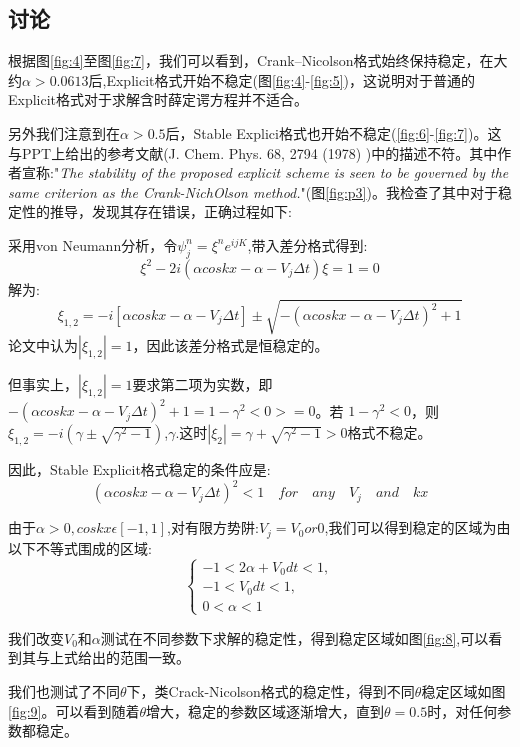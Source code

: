 \documentclass[11pt]{article}
\begin{document}
\subsection{讨论}
根据图\ref{fig:4}至图\ref{fig:7}，我们可以看到，Crank–Nicolson格式始终保持稳定，在大约$\alpha>0.0613$后,Explicit格式开始不稳定(图\ref{fig:4}-\ref{fig:5})，这说明对于普通的Explicit格式对于求解含时薛定谔方程并不适合。

另外我们注意到在$\alpha>0.5$后，Stable Explici格式也开始不稳定(\ref{fig:6}-\ref{fig:7})。这与PPT上给出的参考文献(J. Chem. Phys. 68, 2794 (1978)
)中的描述不符。其中作者宣称:"\textit{The stability of the proposed explicit scheme is seen to be governed by the same criterion as the Crank-NichOlson method.}"(图\ref{fig:p3})。我检查了其中对于稳定性的推导，发现其存在错误，正确过程如下:

采用von Neumann分析，令$\psi_j^n=\xi^n e^{i j K}$,带入差分格式得到:
\[\xi^2-2i(\alpha coskx -\alpha -V_j \Delta t)\xi=1=0\]
解为:
\[\xi_{1,2}=-i[\alpha coskx-\alpha -V_j \Delta t] \pm \sqrt{-(\alpha coskx-\alpha-V_j \Delta t)^2+1}\]
论文中认为$|\xi_{1,2}|=1$，因此该差分格式是恒稳定的。


但事实上，$|\xi_{1,2}|=1$要求第二项为实数，即$-(\alpha coskx-\alpha-V_j \Delta t)^2+1=1-\gamma^2<0>=0$。若
$1-\gamma^2<0$，则$\xi_{1,2}=-i(\gamma \pm \sqrt{\gamma^2-1})$,$\gamma$.这时$|\xi_2|=\gamma+ \sqrt{\gamma^2-1}>0$格式不稳定。

因此，Stable Explicit格式稳定的条件应是:
\[(\alpha coskx-\alpha-V_j \Delta t)^2<1 \quad for \quad any \quad V_j \quad and \quad kx\]

由于$\alpha>0,coskx \epsilon [-1,1]$,对有限方势阱:$V_j=V_0 or 0$,我们可以得到稳定的区域为由以下不等式围成的区域:
\[
\begin{cases} 
-1<2\alpha+V_0 dt<1, \\
-1<V_0 dt<1, \\
0<\alpha<1
\end{cases}
\]

我们改变$V_0$和$\alpha$测试在不同参数下求解的稳定性，得到稳定区域如图\ref{fig:8},可以看到其与上式给出的范围一致。

我们也测试了不同$\theta$下，类Crack-Nicolson格式的稳定性，得到不同$\theta$稳定区域如图\ref{fig:9}。可以看到随着$\theta$增大，稳定的参数区域逐渐增大，直到$\theta=0.5$时，对任何参数都稳定。
\end{document}
